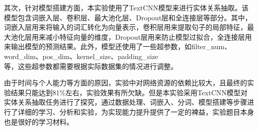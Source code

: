 \documentclass{report}
\begin{document}
	其次，针对模型搭建方面，本实验使用了TextCNN模型来进行实体关系抽取。该模型包含词嵌入层、卷积层、最大池化层、Dropout层和全连接层等部分。其中，词嵌入层用来将输入的词汇转化为向量表示，卷积层用来提取句子的局部特征，最大池化层用来减小特征向量的维度，Dropout层用来防止模型过拟合，全连接层用来输出模型的预测结果。此外，模型还使用了一些超参数，如filter\_num、word\_dim、pos\_dim、kernel\_size、padding\_size\\等，这些超参数都需要根据实际数据集的情况进行调整。
	
	由于时间与个人能力等方面的原因，实验中对网络资源的依赖比较大，且最终的实验结果只能达到81\%左右，实验效果有所欠缺。但是本实验采用TextCNN模型对实体关系抽取任务进行了探究，通过数据处理、词嵌入、分词、模型搭建等步骤进行了详细的学习、分析和实验，为实现能力提升提供了一定的裨益，实验题目本身也是很好的学习材料。
	
	
\end{document}

